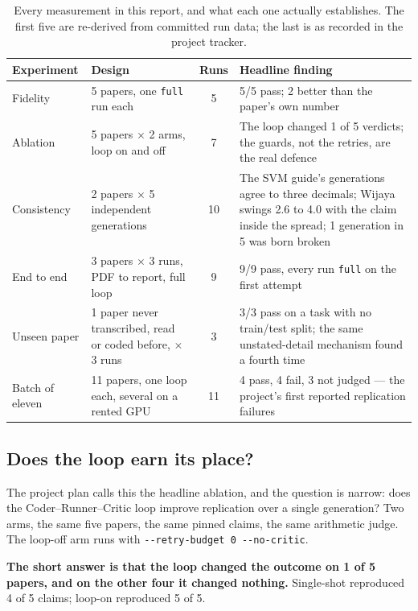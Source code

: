 \documentclass[10pt,twocolumn]{article}
\newcommand{\squeeze}{\setlength{\tabcolsep}{4pt}}
\begin{document}
\begin{table}[tbp]
\centering
\small
\caption{Every measurement in this report, and what each one actually establishes. The first five
are re-derived from committed run data; the last is as recorded in the project tracker.}
\label{tab:experiments}
\squeeze
\begin{tabular}{L{0.14\textwidth}L{0.22\textwidth}cL{0.48\textwidth}}
\toprule
Experiment & Design & Runs & Headline finding \\
\midrule
Fidelity & 5 papers, one \texttt{full} run each & 5 & 5/5 pass; 2 better than the paper's own
  number \\
Ablation & 5 papers $\times$ 2 arms, loop on and off & 7 & The loop changed 1 of 5 verdicts; the
  guards, not the retries, are the real defence \\
Consistency & 2 papers $\times$ 5 independent generations & 10 & The SVM guide's generations agree
  to three decimals; Wijaya swings 2.6 to 4.0 with the claim inside the spread; 1 generation in 5
  was born broken \\
End to end & 3 papers $\times$ 3 runs, PDF to report, full loop & 9 & 9/9 pass, every run
  \texttt{full} on the first attempt \\
Unseen paper & 1 paper never transcribed, read or coded before, $\times$ 3 runs & 3 & 3/3 pass on
  a task with no train/test split; the same unstated-detail mechanism found a fourth time \\
Batch of eleven & 11 papers, one loop each, several on a rented GPU & 11 & 4 pass, 4 fail, 3 not
  judged --- the project's first reported replication failures \\
\bottomrule
\end{tabular}
\end{table}

\subsection{Does the loop earn its place?}

The project plan calls this the headline ablation, and the question is narrow: does the
Coder--Runner--Critic loop improve replication over a single generation? Two arms, the same five
papers, the same pinned claims, the same arithmetic judge. The loop-off arm runs with
\texttt{-{}-retry-budget 0 -{}-no-critic}.

\textbf{The short answer is that the loop changed the outcome on 1 of 5 papers, and on the other
four it changed nothing.} Single-shot reproduced 4 of 5 claims; loop-on reproduced 5 of 5.
\end{document}
